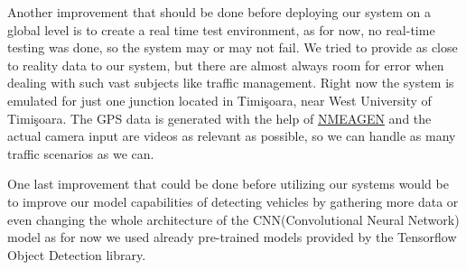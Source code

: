 \documentclass[17pt]{report}
\begin{document}
\indent 
Another improvement that should be done before deploying our system on a 
global level is to create a real time test environment, as for now,
no real-time testing was done, so the system may or may not fail. 
We tried to provide as close to reality data to our system, but there 
are almost always room for error when dealing with such vast subjects
like traffic management. Right now the system is emulated for just
one junction located in Timişoara, near West University of Timişoara.
The GPS data is generated with the help of 
\href{https://www.nmeagen.org/}{NMEAGEN} and the actual camera input 
are videos as relevant as possible, so we can handle as many traffic 
scenarios as we can.

\indent
One last improvement that could be done before utilizing our systems 
would be to improve our model capabilities of detecting vehicles by 
gathering more data or even changing the whole architecture of the 
CNN(Convolutional Neural Network) model as for now we used already 
pre-trained models provided by the Tensorflow Object Detection library.
\pagebreak
\printbibliography
\end{document}
